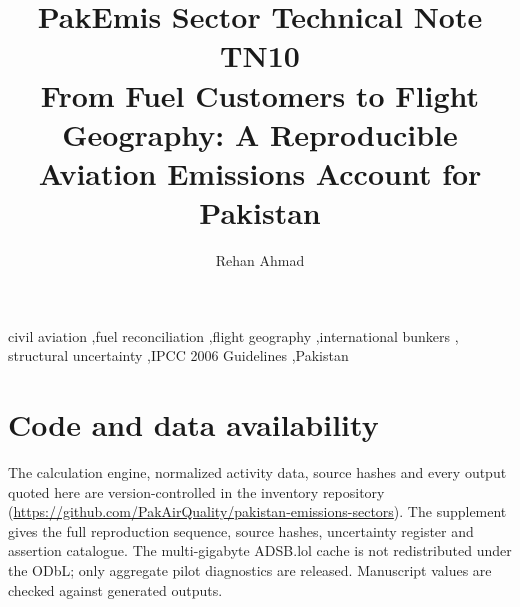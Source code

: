 \documentclass[5p,times,authoryear]{elsarticle}
\begin{document}
\begin{frontmatter}
\title{PakEmis Sector Technical Note TN10\\[4pt]
From Fuel Customers to Flight Geography: A Reproducible Aviation Emissions Account for Pakistan}
\author[paqi]{Rehan Ahmad}
\address[paqi]{Pakistan Air Quality Initiative (PAQI), Karachi, Pakistan}
\begin{abstract}

\end{abstract}
\begin{keyword}
civil aviation \sep fuel reconciliation \sep flight geography \sep international bunkers \sep
structural uncertainty \sep IPCC 2006 Guidelines \sep Pakistan
\end{keyword}
\end{frontmatter}



\ReleaseCover




\FloatBarrier

\FloatBarrier



\FloatBarrier

\section*{Code and data availability}
The calculation engine, normalized activity data, source hashes and every output quoted here
are version-controlled in the inventory repository
(\url{https://github.com/PakAirQuality/pakistan-emissions-sectors}). The supplement gives the full reproduction sequence, source hashes,
uncertainty register and assertion catalogue. The multi-gigabyte ADSB.lol cache is not
redistributed under the ODbL; only aggregate pilot diagnostics are released. Manuscript values
are checked against generated outputs.



\end{document}
